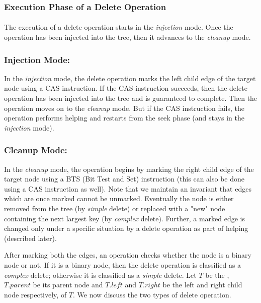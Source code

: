 \subsubsection{Execution Phase of a Delete Operation} \paragraph{}

The execution of a delete operation starts in the \textit{injection} mode. Once the operation has been injected into the tree, then it advances to the \textit{cleanup} mode.

\subsubsection{Injection Mode:} In the \textit{injection} mode, the delete operation marks the left child edge of the target node using a CAS instruction. If the CAS instruction succeeds, then the delete operation has been injected into the tree and is guaranteed to complete. Then the operation moves on to the \textit{cleanup} mode. But if the CAS instruction fails, the operation performs helping and restarts from the seek phase (and stays in the \textit{injection} mode).

\subsubsection{Cleanup Mode:} In the \textit{cleanup} mode, the operation begins by marking the right child edge of the target node using a BTS (Bit Test and Set) instruction (this can also be done using a CAS instruction as well). Note that we maintain an invariant that edges which are once marked cannot be unmarked. Eventually the node is either removed from the tree (by \textit{simple} delete) or replaced with a "new" node containing the next largest key (by \textit{complex} delete). Further, a marked edge is changed only under a specific situation by a delete operation as part of helping (described later). \par

After marking both the edges, an operation checks whether the node is a binary node or not. If it is a binary node, then the delete operation is classified as a \textit{complex} delete; otherwise it is classified as a \textit{simple} delete. Let $T$ be the \terminalnode, $T.parent$ be its parent node and $T.left$ and $T.right$ be the left and right child node respectively, of $T$. We now discuss the two types of delete operation.
